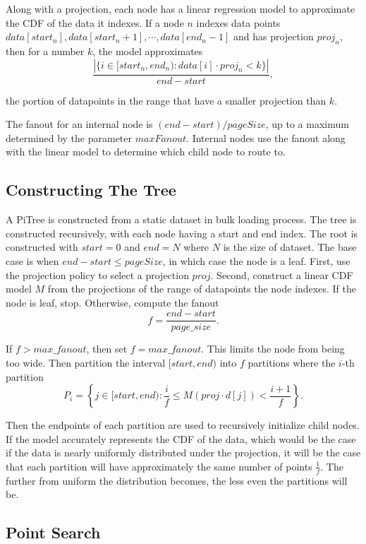\documentclass[sigconf,10pt]{acmart}
\begin{document}
Along with a projection, each node has a linear regression model 
to approximate the CDF of the data it indexes. If a node $n$ indexes data points
$data[start_n], data[start_n + 1], \cdots, data[end_n - 1]$ and has projection $proj_n$,
then for a number $k$, the
model approximates
\[ 
  \frac{|\{i \in [start_n, end_n) : data[i] \cdot proj_n < k\}|}{end - start},
\]

the portion of datapoints in the range that have a 
smaller projection than $k$.

The fanout for an internal node is $(end - start) / pageSize$, up to a maximum determined
by the parameter $maxFanout$. Internal nodes use the fanout along with the linear model
to determine which child node to route to.

\subsection{Constructing The Tree}

A PiTree is constructed from a static dataset in bulk loading process.
The tree is constructed recursively, with each node having a start and 
end index. The root is constructed with $start=0$ and $end=N$ where $N$
is the size of dataset. The base case is when $end - start \leq pageSize$,
in which case the node is a leaf.
First, use the projection policy to select a projection $proj$.
Second, construct a linear CDF model $M$ from the projections of the range of datapoints
the node indexes. If the node is leaf, stop. Otherwise,
compute the fanout
\[
  f = \frac{end - start}{page\_size}.
\]

If $f > max\_fanout$, then set $f = max\_fanout$. This limits
the node from being too wide.
Then partition the interval $[start, end)$ into $f$ partitions
where the $i$-th partition 
\[
  P_i = \left\{j \in [start, end): \frac{i}{f} \leq M(proj \cdot d[j]) < \frac{i+1}{f} \right\}.
\]

Then the endpoints of each partition are used to recursively initialize child nodes.
If the model accurately represents the CDF of the data, which would be the case
if the data is nearly uniformly distributed under the projection,
it will be the case that each partition will have approximately the same number of
points $\frac{1}{f}$. The further from uniform the distribution becomes,
the less even the partitions will be.


\subsection{Point Search}
\end{document}
